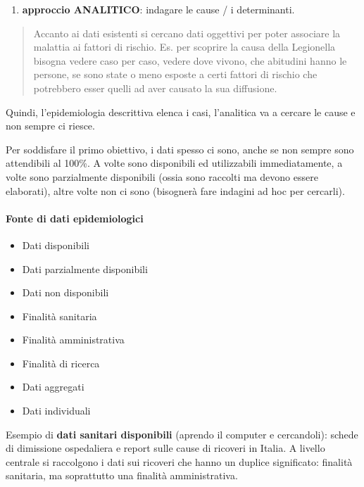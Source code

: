 \begin{enumerate}
\def\labelenumi{\arabic{enumi}.}
\item
  \textbf{approccio ANALITICO}: indagare le cause / i determinanti.
\end{enumerate}

\begin{quote}
Accanto ai dati esistenti si cercano dati oggettivi per poter associare
la malattia ai fattori di rischio. Es. per scoprire la causa della
Legionella bisogna vedere caso per caso, vedere dove vivono, che
abitudini hanno le persone, se sono state o meno esposte a certi fattori
di rischio che potrebbero esser quelli ad aver causato la sua
diffusione.
\end{quote}

Quindi, l'epidemiologia descrittiva elenca i casi, l'analitica va a
cercare le cause e non sempre ci riesce.

Per soddisfare il primo obiettivo, i dati spesso ci sono, anche se non
sempre sono attendibili al 100\%. A volte sono disponibili ed
utilizzabili immediatamente, a volte sono parzialmente disponibili
(ossia sono raccolti ma devono essere elaborati), altre volte non ci
sono (bisognerà fare indagini ad hoc per cercarli).

\paragraph{Fonte di dati epidemiologici}


\begin{itemize}
\item
  Dati disponibili
\item
  Dati parzialmente disponibili
\item
  Dati non disponibili
\item
  Finalità sanitaria
\item
  Finalità amministrativa
\item
  Finalità di ricerca
\item
  Dati aggregati
\item
  Dati individuali
\end{itemize}

Esempio di \textbf{dati sanitari disponibili} (aprendo il computer e
cercandoli): schede di dimissione ospedaliera e report sulle cause di
ricoveri in Italia. A livello centrale si raccolgono i dati sui ricoveri
che hanno un duplice significato: finalità sanitaria, ma soprattutto una
finalità amministrativa.

